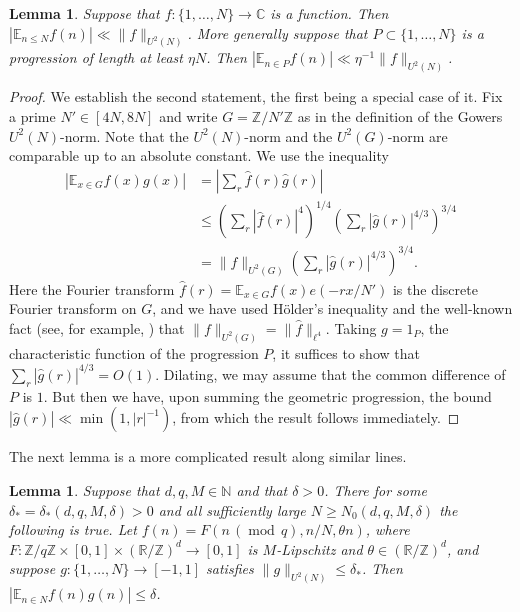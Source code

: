 \documentclass[10pt,reqno]{amsart}
\newtheorem{lemma}[theorem]{Lemma}
\theoremstyle{definition}
\theoremstyle{remark}
\newcommand{\md}[1]{\ensuremath{\,(\operatorname{mod}\, #1)}}
\renewcommand{\leq}{\leqslant}
\renewcommand{\geq}{\geqslant}
\def\R{\mathbb{R}}
\def\C{\mathbb{C}}
\def\Z{\mathbb{Z}}
\def\E{\mathbb{E}}
\def\N{\mathbb{N}}
\numberwithin{equation}{section}
\begin{document}
\begin{lemma}\label{gowers-progressions}
Suppose that $f : \{1,\dots,N\} \rightarrow \C$ is a function. Then $|\E_{n \leq N} f(n)| \ll \| f \|_{U^2(N)}$.
More generally suppose that $P \subset \{1,\dots,N\}$ is a progression of length at least $\eta N$. Then $|\E_{n \in P} f(n)| \ll \eta^{-1} \| f \|_{U^2(N)}$.
\end{lemma}
\begin{proof}  We establish the second statement, the first being a special case of it. Fix a prime $N' \in [4N,8N]$ and write $G = \Z/N'\Z$ as in the definition of the Gowers $U^2(N)$-norm. Note that the $U^2(N)$-norm and the $U^2(G)$-norm are comparable up to an absolute constant. We use the inequality
\begin{align*} |\E_{x \in G} f(x) g(x)| 
  & = \left| \sum_r \hat{f}(r) \hat{g}(r) \right| \\
  & \leq \left(\sum_r |\hat{f}(r)|^4 \right)^{1/4} \left(\sum_r |\hat{g}(r)|^{4/3} \right)^{3/4}  \\ 
  & = \| f \|_{U^2(G)} \left(\sum_r |\hat{g}(r)|^{4/3} \right)^{3/4}.
\end{align*}
Here the Fourier transform $\hat{f}(r) = \E_{x \in G} f(x) e(-rx/N')$ is the discrete Fourier transform on $G$, and we have used H\"older's inequality and the well-known fact (see, for example, \cite[Chapter 11]{tv}) that $\| f \|_{U^2(G)} = \| \hat{f} \|_{\ell^4}$. Taking $g = 1_P$, the characteristic function of the progression $P$, it suffices to show that $\sum_r |\hat{g}(r)|^{4/3} = O(1)$. Dilating, we may assume that the common difference of $P$ is $1$. But then we have, upon summing the geometric progression, the bound $|\hat{g}(r)| \ll \min(1, |r|^{-1})$, from which the result follows immediately.\end{proof}


The next lemma is a more complicated result along similar lines.

\begin{lemma}\label{gowers-orthog-struct}
Suppose that $d, q, M \in \N$ and that $\delta > 0$. There for some $\delta_*=\delta_*(d, q, M,\delta)>0$ and all sufficiently large $N \geq N_0(d,q,M,\delta)$ the following is true. Let $f(n) = F(n\md q, n/N,\theta n)$, where $F:\Z/q\Z \times [0, 1] \times (\R / \Z)^d\to[0,1]$ is $M$-Lipschitz and $\theta \in (\R / \Z)^d$, and suppose $g : \{1,\dots,N\} \to [-1,1]$ satisfies $\|g\|_{U^2(N)} \leq \delta_*$.  Then $\left| \E_{n \in N} f(n) g(n) \right| \leq \delta$.
\end{lemma}
\end{document}
